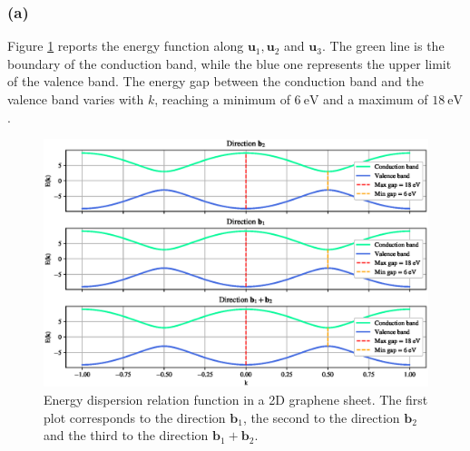 \documentclass{article}
\newcommand{\ve}[1]{\mathbf{#1}}
\begin{document}
\subsubsection*{(a)}
Figure \ref{fig:E_k} reports the energy function along $\ve u_1, \ve u_2$ and $\ve u_3$.
The green line is the boundary of the conduction band, while the blue one represents the upper limit of the valence band.
The energy gap between the conduction band and the valence band varies with $k$, reaching a minimum of $\SI{6}{\electronvolt}$ and a maximum of 
$\SI{18}{\electronvolt}$.
\begin{figure}
    \centering 
    \includegraphics[scale=0.7]{Ek.eps}
    \caption{Energy dispersion relation function in a 2D graphene sheet. The first plot 
    corresponds to the direction $\ve b_1$, the second to the direction $\ve b_2$ and the third to the direction $\ve b_1 + \ve b_2$.}
    \label{fig:E_k}
\end{figure}
\end{document}
